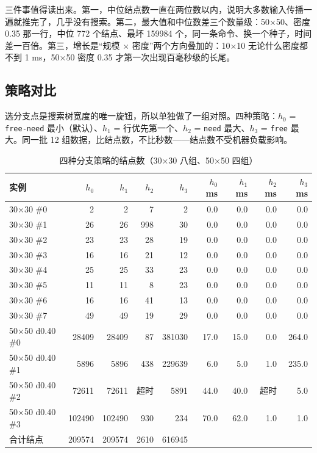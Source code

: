 \documentclass[12pt,a4paper,fontset=windows]{ctexart}
\newcommand{\code}[1]{\texttt{#1}}
\begin{document}
三件事值得读出来。第一，中位结点数一直在两位数以内，说明大多数输入传播一遍就推完了，几乎没有搜索。第二，最大值和中位数差三个数量级：50×50、密度 0.35 那一行，中位 772 个结点、最坏 159984 个，同一条命令、换一个种子，时间差一百倍。第三，增长是“规模 × 密度”两个方向叠加的：10×10 无论什么密度都不到 1 ms，50×50 密度 0.35 才第一次出现百毫秒级的长尾。

\subsection{策略对比}

选分支点是搜索树宽度的唯一旋钮，所以单独做了一组对照。四种策略：$h_0$ = \code{free-need} 最小（默认）、$h_1$ = 行优先第一个、$h_2$ = \code{need} 最大、$h_3$ = \code{free} 最大。同一批 12 组数据，比结点数，不比秒数——结点数不受机器负载影响。

\begin{table}[htbp]
\centering
\caption{四种分支策略的结点数（30×30 八组、50×50 四组）}
\label{tab:heur}
\small
\begin{tabular}{lrrrrrrrr}
\toprule
\rowcolor{gray!12}实例 & $h_0$ & $h_1$ & $h_2$ & $h_3$ & $h_0$ ms & $h_1$ ms & $h_2$ ms & $h_3$ ms \\
\midrule
30×30 \#0 & 2 & 2 & 7 & 2 & 0.0 & 0.0 & 0.0 & 0.0 \\
30×30 \#1 & 26 & 26 & 998 & 30 & 0.0 & 0.0 & 0.0 & 0.0 \\
30×30 \#2 & 23 & 23 & 28 & 19 & 0.0 & 0.0 & 0.0 & 0.0 \\
30×30 \#3 & 16 & 16 & 21 & 12 & 0.0 & 0.0 & 0.0 & 0.0 \\
30×30 \#4 & 25 & 25 & 33 & 23 & 0.0 & 0.0 & 0.0 & 0.0 \\
30×30 \#5 & 11 & 11 & 8 & 23 & 0.0 & 0.0 & 0.0 & 0.0 \\
30×30 \#6 & 16 & 16 & 41 & 13 & 0.0 & 0.0 & 0.0 & 0.0 \\
30×30 \#7 & 49 & 49 & 19 & 29 & 0.0 & 0.0 & 0.0 & 0.0 \\
50×50 d0.40 \#0 & 28409 & 28409 & 87 & 381030 & 17.0 & 15.0 & 0.0 & 264.0 \\
50×50 d0.40 \#1 & 5896 & 5896 & 438 & 229639 & 6.0 & 5.0 & 1.0 & 235.0 \\
50×50 d0.40 \#2 & 72611 & 72611 & 超时 & 5891 & 44.0 & 40.0 & 超时 & 5.0 \\
50×50 d0.40 \#3 & 102490 & 102490 & 930 & 234 & 70.0 & 62.0 & 1.0 & 1.0 \\
\midrule
合计结点 & 209574 & 209574 & 2610 & 616945 & & & & \\
\bottomrule
\end{tabular}
\end{table}
\end{document}
